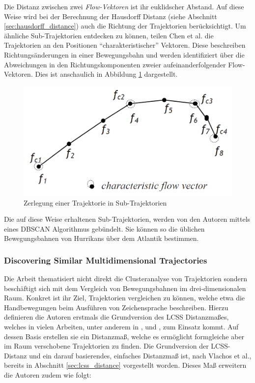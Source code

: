Die Distanz zwischen zwei \textit{Flow-Vektoren} ist ihr euklidscher Abstand. Auf diese Weise wird bei
der Berechnung der Hausdorff Distanz (siehe Abschnitt \ref{sec:hausdorff_distance}) auch die Richtung
der Trajektorien berücksichtigt.
Um ähnliche Sub-Trajektorien entdecken zu können, teilen Chen et al. die Trajektorien an den Positionen
``charakteristischer'' Vektoren. Diese beschreiben Richtungsänderungen in einer
Bewegungsbahn und werden identifiziert über die Abweichungen in den Richtungskomponenten zweier
aufeinanderfolgender Flow-Vektoren. Dies ist anschaulich in Abbildung \ref{fig:relw_chen_flow_vector} dargestellt.

\begin{figure}[H]
    \centering
    \includegraphics[width=0.45\linewidth]{../resources/img/RelatedWork/Chen_trajectory_splitting}
    \caption[Zerlegung einer Trajektorie in Sub-Trajektorien]{Zerlegung einer Trajektorie in Sub-Trajektorien \cite[]{Chen2011}}
    \label{fig:relw_chen_flow_vector}
\end{figure}

Die auf diese Weise erhaltenen Sub-Trajektorien, werden von den Autoren mittels eines DBSCAN Algorithmus gebündelt.
Sie können so die üblichen Bewegungsbahnen von Hurrikans über dem Atlantik bestimmen.


\subsubsection*{Discovering Similar Multidimensional Trajectories}
\label{sec:relw_vlachos}
Die Arbeit \cite[]{Vlachos2002} thematisiert nicht direkt die Clusteranalyse von Trajektorien sondern
beschäftigt sich mit dem Vergleich von Bewegungsbahnen im drei-dimensionalen Raum. Konkret ist ihr Ziel,
Trajektorien vergleichen zu können, welche etwa die Handbewegungen beim Ausführen von Zeichensprache beschreiben.
Hierzu definieren die Autoren erstmals die Grundversion des LCSS Distanzmaßes, welches in vielen Arbeiten,
unter anderem in \cite[]{Atev2006}, \cite[]{Buzan2004} und \cite[]{Chen2005}, zum Einsatz kommt.
Auf dessen Basis erstellen sie ein Distanzmaß, welche es ermöglicht formgleiche aber im Raum verschobene Trajektorien zu finden.
Die Grundversion der LCSS-Distanz und ein darauf basierendes, einfaches Distanzmaß ist, nach Vlachos et al.,
bereits in Abschnitt \ref{sec:lcss_distance} vorgestellt worden.
Dieses Maß erweitern die Autoren zudem wie folgt:

